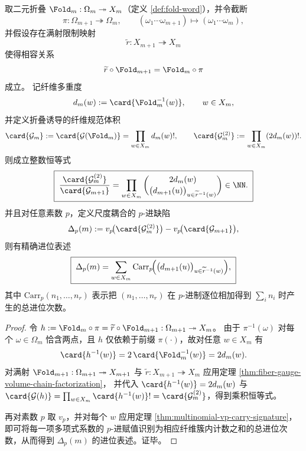 \begin{theorem}\label{thm:fold-multiscale-carry-defect}
取二元折叠 \(\Fold_m:\Omega_m\twoheadrightarrow X_m\)（定义 \ref{def:fold-word}），并令截断
\[
\pi:\Omega_{m+1}\twoheadrightarrow\Omega_m,\qquad
(\omega_1\cdots \omega_{m+1})\mapsto(\omega_1\cdots\omega_m),
\]
并假设存在满射限制映射
\[
\widetilde r:X_{m+1}\twoheadrightarrow X_m
\]
使得相容关系
\[
\widetilde r\circ\Fold_{m+1}=\Fold_m\circ\pi
\]
成立。
记纤维多重度
\[
d_m(w):=\card{\Fold_m^{-1}(w)},\qquad w\in X_m,
\]
并定义折叠诱导的纤维规范体积
\[
\card{\mathcal{G}_m}:=\card{\mathcal{G}(\Fold_m)}=\prod_{w\in X_m} d_m(w)!,
\qquad
\card{\mathcal{G}_m^{(2)}}:=\prod_{w\in X_m}(2d_m(w))!.
\]
则成立整数恒等式
\[
\boxed{\;
\frac{\card{\mathcal{G}_m^{(2)}}}{\card{\mathcal{G}_{m+1}}}
=
\prod_{w\in X_m}
\binom{2d_m(w)}{\bigl(d_{m+1}(u)\bigr)_{u\in\widetilde r^{-1}(w)}}
\in\NN.
\;}
\]
并且对任意素数 \(p\)，定义尺度耦合的 \(p\)-进缺陷
\[
\Delta_p(m):=v_p\!\bigl(\card{\mathcal{G}_m^{(2)}}\bigr)-v_p\!\bigl(\card{\mathcal{G}_{m+1}}\bigr),
\]
则有精确进位表述
\[
\boxed{\;
\Delta_p(m)
=
\sum_{w\in X_m}
\mathrm{Carr}_p\!\Bigl(\bigl(d_{m+1}(u)\bigr)_{u\in\widetilde r^{-1}(w)}\Bigr),
\;}
\]
其中 \(\mathrm{Carr}_p(n_1,\dots,n_r)\) 表示把 \((n_1,\dots,n_r)\) 在 \(p\)-进制逐位相加得到 \(\sum_i n_i\) 时产生的总进位次数。
\end{theorem}

\begin{proof}
令 \(h:=\Fold_m\circ\pi=\widetilde r\circ\Fold_{m+1}:\Omega_{m+1}\twoheadrightarrow X_m\)。
由于 \(\pi^{-1}(\omega)\) 对每个 \(\omega\in\Omega_m\) 恰含两点，且 \(h\) 仅依赖于前缀 \(\pi(\cdot)\)，故对任意 \(w\in X_m\) 有
\[
\card{h^{-1}(w)}=2\,\card{\Fold_m^{-1}(w)}=2d_m(w).
\]
对满射 \(\Fold_{m+1}:\Omega_{m+1}\twoheadrightarrow X_{m+1}\) 与 \(\widetilde r:X_{m+1}\twoheadrightarrow X_m\) 应用定理 \ref{thm:fiber-gauge-volume-chain-factorization}，
并代入 \(\card{h^{-1}(w)}=2d_m(w)\) 与
\(
\card{\mathcal{G}(h)}=\prod_{w\in X_m}\card{h^{-1}(w)}!=\card{\mathcal{G}_m^{(2)}}
\)，得到乘积恒等式。

再对素数 \(p\) 取 \(v_p\)，并对每个 \(w\) 应用定理 \ref{thm:multinomial-vp-carry-signature}，
即可将每一项多项式系数的 \(p\)-进赋值识别为相应纤维簇内计数之和的总进位次数，从而得到 \(\Delta_p(m)\) 的进位表述。证毕。
\end{proof}

